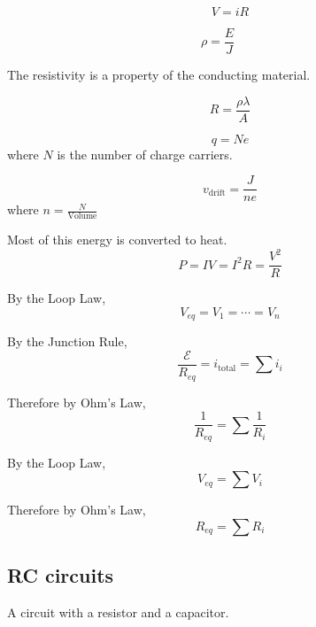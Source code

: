 \begin{namedlaw}
  \[
    V = iR
  \]
\end{namedlaw}

\begin{definition}[Resistivity]
  \[
    \rho = \frac{E}{J} \qquad
  \]

  The resistivity is a property of the conducting material.
\end{definition}

\begin{lemma}
  \[
    R = \frac{\rho \lambda}{A}
  \]
\end{lemma}

\begin{law}
  \[
    q = Ne
  \]
  where $N$ is the number of charge carriers.
\end{law}

\begin{definition}
  \[
    v_\text{drift} = \frac{J}{ne}
  \]
  where $n = \frac{N}{\text{Volume}}$
\end{definition}

\begin{theorem}
  Most of this energy is converted to heat.
  \[
    P = IV = I^2 R = \frac{V^2}{R}
  \]
\end{theorem}

\begin{lemma}
  By the Loop Law,
  \[
    V_{eq} = V_1 = \cdots = V_n
  \]

  By the Junction Rule,
  \[
    \frac{\mathcal{E}}{R_{eq}} = i_{\text{total}} = \sum i_i
  \]

  Therefore by Ohm's Law,
  \[
    \frac{1}{R_{eq}} = \sum \frac{1}{R_i}
  \]
\end{lemma}

\begin{lemma}
  By the Loop Law,
  \[
    V_{eq} = \sum V_i
  \]

  Therefore by Ohm's Law,
  \[
    R_{eq} = \sum R_i
  \]
\end{lemma}

\subsection{RC circuits}

\begin{definition}[RC circuit]
  A circuit with a resistor and a capacitor.
\end{definition}

